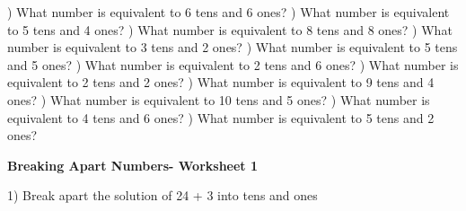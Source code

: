 \documentclass{article}%
\begin{document}
\newline%
) What number is equivalent to 6 tens and 6 ones?%
\newline%
\newline%
) What number is equivalent to 5 tens and 4 ones?%
\newline%
\newline%
) What number is equivalent to 8 tens and 8 ones?%
\newline%
\newline%
) What number is equivalent to 3 tens and 2 ones?%
\newline%
\newline%
) What number is equivalent to 5 tens and 5 ones?%
\newline%
\newline%
) What number is equivalent to 2 tens and 6 ones?%
\newline%
\newline%
) What number is equivalent to 2 tens and 2 ones?%
\newline%
\newline%
) What number is equivalent to 9 tens and 4 ones?%
\newline%
\newline%
) What number is equivalent to 10 tens and 5 ones?%
\newline%
\newline%
) What number is equivalent to 4 tens and 6 ones?%
\newline%
\newline%
) What number is equivalent to 5 tens and 2 ones?%
\newline%
\newline%
\newline%
\pagebreak%
\large%
\begin{center}%
\textbf{Breaking Apart Numbers- Worksheet 1}%
\newline%
\end{center} \normalsize%
1) Break apart the solution of 24 + 3 into tens and ones%
\end{document}
